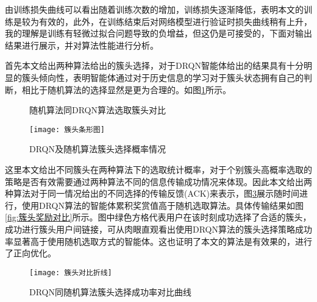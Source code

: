 由训练损失曲线可以看出随着训练次数的增加，训练损失逐渐降低，表明本文的训练是较为有效的，此外，在训练结束后对网络模型进行验证时损失曲线稍有上升，我的理解是训练有轻微过拟合问题导致的负增益，但这仍是可接受的，下面对输出结果进行展示，并对算法性能进行分析。

首先本文给出两种算法给出的簇头选择，对于DRQN智能体给出的结果具有十分明显的簇头倾向性，表明智能体通过对于历史信息的学习对于簇头状态拥有自己的判断，相比于随机算法的选择显然是更为合理的。如图\ref{fig:簇头动作对比}所示。

\begin{figure}[htbp]
	\begin{minipage}{\textwidth}
		\centering
		\subfigure{\label{fig:簇头动作DRQN}}\addtocounter{subfigure}{-2}
		\hspace{1em}
		\subfigure{\label{fig:簇头动作random}}\addtocounter{subfigure}{-2}
		\hspace{1em}	
	\end{minipage}
	\vspace{0.2em}
	\caption{随机算法同DRQN算法选取簇头对比}\label{fig:簇头动作对比}
\end{figure}

\begin{figure}[htbp]
	\centering
	\texttt{[image: 簇头条形图]}
	\caption{DRQN及随机算法簇头选择概率情况}
	\label{fig：簇头条形图}
\end{figure}

这里本文给出不同簇头在两种算法下的选取统计概率，对于个别簇头高概率选取的策略是否有效需要通过两种算法不同的信息传输成功情况来体现。因此本文给出两种算法对于同一情况给出的不同选择的传输反馈(ACK)来表示，图\ref{fig：簇头对比折线}展示随时间进行，使用DRQN算法的智能体累积奖赏值高于随机选取算法。具体传输结果如图\ref{fig:簇头奖励对比}所示。图中绿色方格代表用户在该时刻成功选择了合适的簇头，成功进行簇头用户间链接，可从肉眼直观看出使用DRQN算法的簇头选择策略成功率显著高于使用随机选取方式的智能体。这也证明了本文的算法是有效果的，进行了正向优化。
\begin{figure}[htbp]
	\centering
	\texttt{[image: 簇头对比折线]}
	\caption{DRQN同随机算法簇头选择成功率对比曲线}
	\label{fig：簇头对比折线}
\end{figure}

